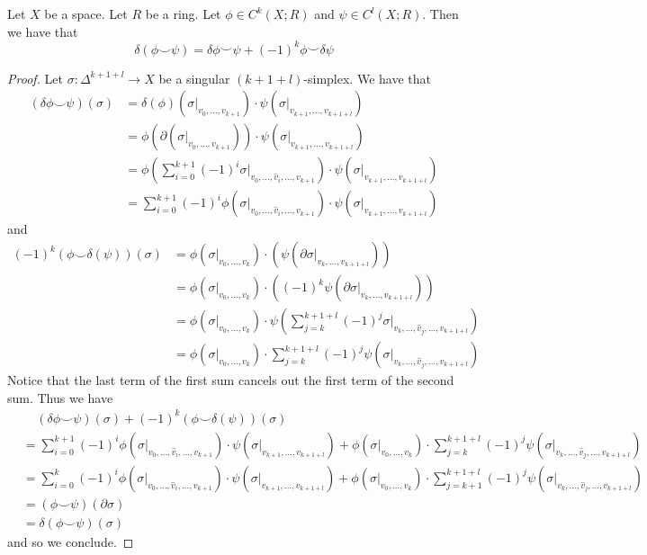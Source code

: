 \documentclass[a4paper]{article}
\begin{document}
\begin{lmm}{}{} Let $X$ be a space. Let $R$ be a ring. Let $\phi\in C^k(X;R)$ and $\psi\in C^l(X;R)$. Then we have that $$\delta(\phi\smile\psi)=\delta\phi\smile\psi+(-1)^k\phi\smile\delta\psi$$ \tcbline
\begin{proof}
Let $\sigma:\Delta^{k+1+l}\to X$ be a singular $(k+1+l)$-simplex. We have that 
\begin{align*}
(\delta\phi\smile\psi)(\sigma)&=\delta(\phi)(\sigma|_{v_0,\dots,v_{k+1}})\cdot\psi(\sigma|_{v_{k+1},\dots,v_{k+1+l}})\\
&=\phi(\partial(\sigma|_{v_0,\dots,v_{k+1}}))\cdot\psi(\sigma|_{v_{k+1},\dots,v_{k+1+l}})\\
&=\phi\left(\sum_{i=0}^{k+1}(-1)^i\sigma|_{v_0,\dots,\hat{v}_i,\dots,v_{k+1}}\right)\cdot\psi(\sigma|_{v_{k+1},\dots,v_{k+1+l}})\\
&=\sum_{i=0}^{k+1}(-1)^i\phi(\sigma|_{v_0,\dots,\hat{v}_i,\dots,v_{k+1}})\cdot\psi(\sigma|_{v_{k+1},\dots,v_{k+1+l}})
\end{align*}
and 
\begin{align*}
(-1)^k\left(\phi\smile\delta(\psi)\right)(\sigma)&=\phi(\sigma|_{v_0,\dots,v_k})\cdot(\psi(\partial\sigma|_{v_k,\dots,v_{k+1+l}}))\\
&=\phi(\sigma|_{v_0,\dots,v_k})\cdot((-1)^k\psi(\partial\sigma|_{v_k,\dots,v_{k+1+l}}))\\
&=\phi(\sigma|_{v_0,\dots,v_k})\cdot\psi\left(\sum_{j=k}^{k+1+l}(-1)^j\sigma|_{v_k,\dots,\hat{v}_j,\dots,v_{k+1+l}}\right)\\
&=\phi(\sigma|_{v_0,\dots,v_k})\cdot\sum_{j=k}^{k+1+l}(-1)^j\psi(\sigma|_{v_k,\dots,\hat{v}_j,\dots,v_{k+1+l}})
\end{align*}
Notice that the last term of the first sum cancels out the first term of the second sum. Thus we have 
\begin{align*}
&\;\;\;\;(\delta\phi\smile\psi)(\sigma)+(-1)^k\left(\phi\smile\delta(\psi)\right)(\sigma)\\
&=\sum_{i=0}^{k+1}(-1)^i\phi(\sigma|_{v_0,\dots,\hat{v}_i,\dots,v_{k+1}})\cdot\psi(\sigma|_{v_{k+1},\dots,v_{k+1+l}})+\phi(\sigma|_{v_0,\dots,v_k})\cdot\sum_{j=k}^{k+1+l}(-1)^j\psi(\sigma|_{v_k,\dots,\hat{v}_j,\dots,v_{k+1+l}})\\
&=\sum_{i=0}^k(-1)^i\phi(\sigma|_{v_0,\dots,\hat{v}_i,\dots,v_{k+1}})\cdot\psi(\sigma|_{v_{k+1},\dots,v_{k+1+l}})+\phi(\sigma|_{v_0,\dots,v_k})\cdot\sum_{j=k+1}^{k+1+l}(-1)^j\psi(\sigma|_{v_k,\dots,\hat{v}_j,\dots,v_{k+1+l}})\\
&=(\phi\smile\psi)(\partial\sigma)\\
&=\delta(\phi\smile\psi)(\sigma)
\end{align*}
and so we conclude. 
\end{proof}
\end{lmm}
\end{document}
